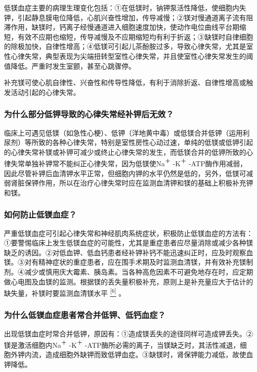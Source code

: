 低镁血症主要的病理生理变化包括：①在低镁时，钠钾泵活性降低，使细胞内失钾，引起静息膜电位降低，心肌兴奋性增加，传导减慢；②镁对慢通道离子流有阻滞作用，缺镁时，钙离子经慢通道进入细胞速度加快，使动作电位曲线平台期缩短，有效不应期也缩短，传导减慢及不应期缩短均有利于折返；③缺镁时自律细胞的除极加快，自律性增高；④低镁可引起儿茶酚胺过多，导致心律失常，尤其是室性心律失常，典型表现为尖端扭转型室性心律失常，并且使室性心律失常发生的阈值降低。严重时发生室颤，甚至心跳骤停。

补充镁可使心肌自律性、兴奋性和传导性降低，有利于消除折返、自律性增高或触发活动引起的心律失常。

\subsubsection{为什么部分低钾导致的心律失常经补钾后无效？}

临床上可遇见低镁（如急性心梗）、低钾（洋地黄中毒）或低镁合并低钾（运用利尿剂）等所致的各种心律失常，特别是室性房性心动过速，单纯的低镁或低钾引起的心律失常补镁或补钾可减少或终止心律失常的发生，而低镁合并的低钾所致的心律失常单独补钾常不能纠正心律失常，因为低镁使Na\textsuperscript{＋}
-K\textsuperscript{＋}
-ATP酶作用减弱，因此尽管补钾后血清钾水平正常，但细胞内钾的水平仍然是低的，另外，低镁可减弱肾脏保钾作用，所以在治疗心律失常时应在监测血清钾和镁的基础上积极补充钾和镁。

\subsubsection{如何防止低镁血症？}

严重低镁血症可引起心律失常和神经肌肉系统症状，积极防止低镁血症的方法有：①要警惕临床上发生低镁血症的可能性，尤其是重症患者应尽量消除或减少各种镁缺乏的诱因。②对低血钾、低血钙患者经补钾补钙不能迅速纠正时，应及时观察血镁。③对有精神症状的重症患者，应在围手术期及时监测血清镁，并有效补充镁制剂。④减少或慎用庆大霉素、胰岛素。当各种高危因素不可避免地存在时，应定期做心电图及血镁的监测。根据镁的丢失量积极补充，原则上是补充量应大于估计的缺失量，补镁时要监测血清镁水平
\protect\hyperlink{text00025.htmlux5cux23ch6-24}{\textsuperscript{{[}6{]}}}
。

\subsubsection{为什么低镁血症患者常合并低钾、低钙血症？}

出现低镁血症时常合并低钾，原因有：①造成镁丢失的途径同样可造成钾丢失。②镁是激活细胞内Na\textsuperscript{＋}
-K\textsuperscript{＋}
-ATP酶所必需的离子，当镁缺乏时，其活性减退，细胞外钾内流，造成细胞外缺钾而致低钾血症。③缺镁时，肾保钾能力减低，故使血钾降低。


